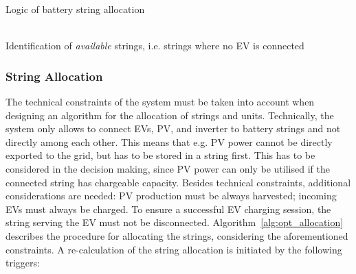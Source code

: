 \documentclass[final,5p,times,twocolumn]{elsarticle}
\begin{document}
\begin{algorithm}[b!]
\caption{Logic of battery string allocation}\label{alg:opt_allocation}
~\\

Identification of \emph{available} strings, i.e. strings where no EV is connected \\



\end{algorithm}

\subsubsection{String Allocation}
The technical constraints of the system must be taken into account when designing an algorithm for the allocation of strings and units. Technically, the system only allows to connect EVs, PV, and inverter to battery strings and not directly among each other. This means that e.g. PV power cannot be directly exported to the grid, but has to be stored in a string first. This has to be considered in the decision making, since PV power can only be utilised if the connected string has chargeable capacity. Besides technical constraints, additional considerations are needed: PV production must be always harvested; incoming EVs must always be charged. To ensure a successful EV charging session, the string serving the EV must not be disconnected. Algorithm~\ref{alg:opt_allocation} describes the procedure for allocating the strings, considering the aforementioned constraints. A re-calculation of the string allocation is initiated by the following triggers:
\end{document}
